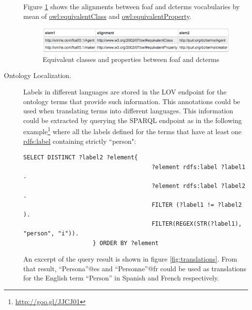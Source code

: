 \begin{description}
	Figure \ref{fig:eqCR} shows the alignments between foaf and dcterms vocabularies by mean of \url{owl:equivalentClass} and \url{owl:equivalentProperty}. 

\begin{figure}
\centering
  \includegraphics[width=1.0\linewidth]{img/equivalentCandR.png}
  \caption{Equivalent classes and properties between foaf and dcterms}
  \label{fig:eqCR}
\end{figure}

							
		\item [Ontology Localization.] Labels in different languages are stored in the LOV endpoint for the ontology terms that provide such information. This annotations could be used when translating terms into different languages. This information could be extracted by querying the SPARQL endpoint as in the following example\footnote{\url{http://goo.gl/JJCJ01}} where all the labels defined for the terms that have at least one \url{rdfs:label} containing strictly ``person":
		
		{\small\begin{verbatim}SELECT DISTINCT ?label2 ?element{
								     ?element rdfs:label ?label1 .
								     ?element rdfs:label ?label2 .
								     FILTER (?label1 != ?label2 ).
								     FILTER(REGEX(STR(?label1), "person", "i")).
					} ORDER BY ?element\end{verbatim}}
						 
								     
		An excerpt of the query result is shown in figure \ref{fig:translations}. From that result, ``Persona''@es and ``Personne''@fr could be used as translations for the English term ``Person'' in Spanish and French respectively.


\begin{figure}
\end{figure}

\end{description}

